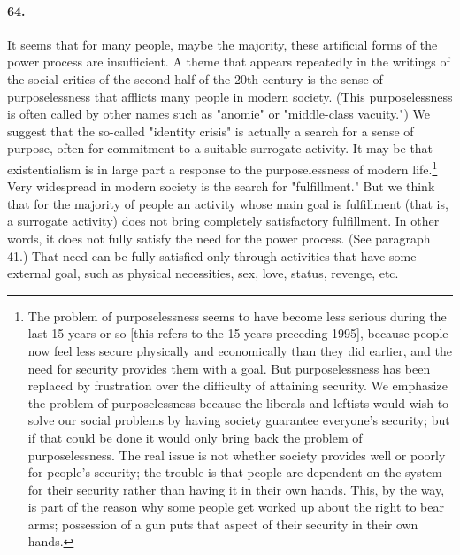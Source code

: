 \documentclass[12pt]{book}
\begin{document}
\paragraph{64.} It seems that for many people, maybe the majority, these artificial forms of the power process are insufficient. A theme that appears repeatedly in the writings of the social critics of the second half of the 20th century is the sense of purposelessness that afflicts many people in modern society.  (This purposelessness is often called by other names such as "anomie" or "middle-class vacuity.") We suggest that the so-called "identity crisis" is actually a search for a sense of purpose, often for commitment to a suitable surrogate activity. It may be that existentialism is in large part a response to the purposelessness of modern life.\footnote{The problem of purposelessness seems to have become less serious during the last 15 years or so [this refers to the 15 years preceding 1995], because people now feel less secure physically and economically than they did earlier, and the need for security provides them with a goal. But purposelessness has been replaced by frustration over the difficulty of attaining security. We emphasize the problem of purposelessness because the liberals and leftists would wish to solve our social problems by having society guarantee everyone's security; but if that could be done it would only bring back the problem of purposelessness. The real issue is not whether society provides well or poorly for people's security; the trouble is that people are dependent on the system for their security rather than having it in their own hands. This, by the way, is part of the reason why some people get worked up about the right to bear arms; possession of a gun puts that aspect of their security in their own hands.} Very widespread in modern society is the search for "fulfillment." But we think that for the majority of people an activity whose main goal is fulfillment (that is, a surrogate activity) does not bring completely satisfactory fulfillment. In other words, it does not fully satisfy the need for the power process. (See paragraph 41.) That need can be fully satisfied only through activities that have some external goal, such as physical necessities, sex, love, status, revenge, etc.
\end{document}
